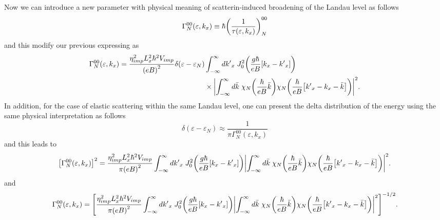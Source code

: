 \noindent
Now we can introduce a new parameter with physical meaning of scatterin-induced broadening of the Landau level as follows
\begin{equation} \label{5.3}
  \Gamma^{00}_{N}(\varepsilon,k_x) \equiv \hbar \qty(\frac{1}{\tau(\varepsilon,k_x)})^{00}_{N}
\end{equation}
and this modify our previous expressing as
\begin{equation} \label{5.4}
  \begin{aligned}
    \Gamma^{00}_{N}(\varepsilon,k_x)  =
    \frac { \eta_{imp}^2 L_x^2 \hbar^2 V_{imp}}{\qty(eB)^2}
    \delta(\varepsilon - \varepsilon_{N}) &
    \int_{-\infty}^{\infty} d {k'}_x \;
    J_0^2\qty(\frac{g\hbar}{eB}[{k}_x - {k'}_x])
    \\
    & \times
    \qty|
    \int_{-\infty}^{\infty} d\bar{k} \;
    {\chi}_{N}\qty(\frac{\hbar}{eB}\bar{k})
    {\chi}_{N}\qty(\frac{\hbar}{eB} \qty[{k'}_x - {k}_x - \bar{k}])|^2.
  \end{aligned}
\end{equation}
In addition, for the case of elastic scattering within the same Landau level, one can present the delta distribution of the energy using the same physical interpretation as follows
\begin{equation} \label{5.5}
  \delta(\varepsilon - \varepsilon_{N}) \approx
  \frac{1}{\pi \Gamma^{00}_{N}(\varepsilon,k_x)}
\end{equation}
and this leads to
\begin{equation} \label{5.6}
  \begin{aligned}
    \qty[\Gamma^{00}_{N}(\varepsilon,k_x)]^2  =
    \frac { \eta_{imp}^2 L_x^2 \hbar^2 V_{imp}}{\pi\qty(eB)^2}
    \int_{-\infty}^{\infty} d {k'}_x \;
    J_0^2\qty(\frac{g\hbar}{eB}[{k}_x - {k'}_x])
    \qty|
    \int_{-\infty}^{\infty} d\bar{k} \;
    {\chi}_{N}\qty(\frac{\hbar}{eB}\bar{k})
    {\chi}_{N}\qty(\frac{\hbar}{eB} \qty[{k'}_x - {k}_x - \bar{k}])|^2.
  \end{aligned}
\end{equation}
and
\begin{equation} \label{5.7}
  \begin{aligned}
    \Gamma^{00}_{N}(\varepsilon,k_x)  =
    \qty[
    \frac { \eta_{imp}^2 L_x^2 \hbar^2 V_{imp}}{\pi\qty(eB)^2}
    \int_{-\infty}^{\infty} d {k'}_x \;
    J_0^2\qty(\frac{g\hbar}{eB}[{k}_x - {k'}_x])
    \qty|
    \int_{-\infty}^{\infty} d\bar{k} \;
    {\chi}_{N}\qty(\frac{\hbar}{eB}\bar{k})
    {\chi}_{N}\qty(\frac{\hbar}{eB} \qty[{k'}_x - {k}_x - \bar{k}])|^2
    ]^{-1/2}.
  \end{aligned}
\end{equation}

